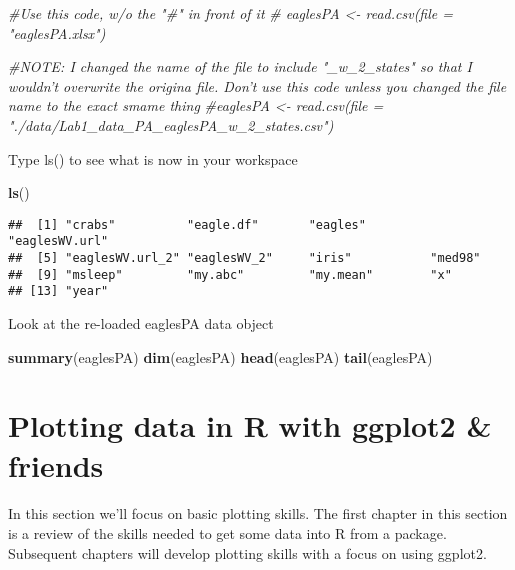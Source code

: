 \documentclass[]{book}
\newenvironment{Shaded}{\begin{snugshade}}{\end{snugshade}}
\newcommand{\KeywordTok}[1]{\textcolor[rgb]{0.13,0.29,0.53}{\textbf{#1}}}
\newcommand{\CommentTok}[1]{\textcolor[rgb]{0.56,0.35,0.01}{\textit{#1}}}
\newcommand{\NormalTok}[1]{#1}
\theoremstyle{definition}
\theoremstyle{definition}
\theoremstyle{definition}
\theoremstyle{remark}
\begin{document}
\begin{Shaded}
\begin{Highlighting}[]
\CommentTok{#Use this code, w/o the "#" in front of it}
\CommentTok{# eaglesPA <- read.csv(file = "eaglesPA.xlsx")}

\CommentTok{#NOTE: I changed the name of the file to include "_w_2_states" so that I wouldn't overwrite the origina file.  Don't use this code unless you changed the file name to the exact smame thing}
\CommentTok{#eaglesPA <- read.csv(file = "./data/Lab1_data_PA_eaglesPA_w_2_states.csv")}
\end{Highlighting}
\end{Shaded}

Type ls() to see what is now in your workspace

\begin{Shaded}
\begin{Highlighting}[]
\KeywordTok{ls}\NormalTok{()}
\end{Highlighting}
\end{Shaded}

\begin{verbatim}
##  [1] "crabs"          "eagle.df"       "eagles"         "eaglesWV.url"  
##  [5] "eaglesWV.url_2" "eaglesWV_2"     "iris"           "med98"         
##  [9] "msleep"         "my.abc"         "my.mean"        "x"             
## [13] "year"
\end{verbatim}

Look at the re-loaded eaglesPA data object

\begin{Shaded}
\begin{Highlighting}[]
\KeywordTok{summary}\NormalTok{(eaglesPA)}
\KeywordTok{dim}\NormalTok{(eaglesPA)}
\KeywordTok{head}\NormalTok{(eaglesPA)}
\KeywordTok{tail}\NormalTok{(eaglesPA)}
\end{Highlighting}
\end{Shaded}

\part{Plotting data in R with ggplot2 \&
friends}\label{part-plotting-data-in-r-with-ggplot2-friends}

\subsection*{}\label{section-2}

In this section we'll focus on basic plotting skills. The first chapter
in this section is a review of the skills needed to get some data into R
from a package. Subsequent chapters will develop plotting skills with a
focus on using ggplot2.
\end{document}
